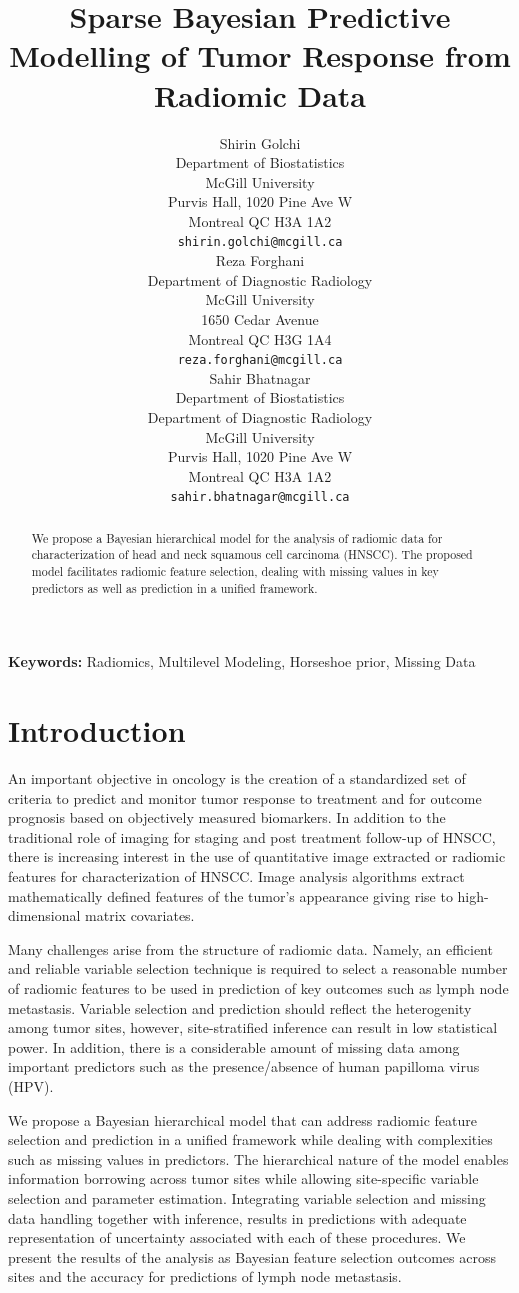\documentclass[10pt]{article}
\title{Sparse Bayesian Predictive Modelling of Tumor Response 
	from Radiomic Data}
\author{
  Shirin Golchi\\
  Department of Biostatistics\\ McGill University \\
  Purvis Hall, 1020 Pine Ave W\\
  Montreal QC H3A 1A2 \\ 
  {\tt shirin.golchi@mcgill.ca} \\\And
  Reza Forghani \\
  Department of Diagnostic Radiology \\ McGill University \\
  1650 Cedar Avenue \\
  Montreal QC H3G 1A4 \\
  {\tt reza.forghani@mcgill.ca} \\\And
  Sahir Bhatnagar \\
  Department of Biostatistics\\ Department of Diagnostic Radiology \\ McGill University \\
  Purvis Hall, 1020 Pine Ave W\\
  Montreal QC H3A 1A2 \\
  {\tt sahir.bhatnagar@mcgill.ca} 
}
\date{}
\begin{document}
\maketitle
\begin{abstract}
We propose a Bayesian hierarchical model for the analysis of radiomic data for characterization of head and neck squamous cell carcinoma (HNSCC). The proposed model facilitates radiomic feature selection, dealing with missing values in key predictors as well as prediction in a unified framework. 


\end{abstract}

{\bf Keywords:} Radiomics, Multilevel Modeling, Horseshoe prior, Missing Data

\section{Introduction}

An important objective in oncology is the creation of a standardized set of criteria to predict and monitor tumor response to treatment and for outcome prognosis based on objectively measured biomarkers. In addition to the traditional role of imaging for staging and post treatment follow-up of HNSCC, there is increasing interest in the use of quantitative image extracted or radiomic features for characterization of HNSCC. Image analysis algorithms extract mathematically defined features of the tumor's appearance giving rise to high-dimensional matrix covariates. 

Many challenges arise from the structure of radiomic data. Namely, an efficient and reliable variable selection technique is required to select a reasonable number of radiomic features to be used in prediction of key outcomes such as lymph node metastasis. Variable selection and prediction should reflect the heterogenity among tumor sites, however, site-stratified inference can result in low statistical power. In addition, there is a considerable amount of missing data among important predictors such as the presence/absence of human papilloma virus (HPV). 

We propose a Bayesian hierarchical model that can address radiomic feature selection and prediction in a unified framework while dealing with complexities such as missing values in predictors. The hierarchical nature of the model enables information borrowing across tumor sites while allowing site-specific variable selection and parameter estimation. Integrating variable selection and missing data handling together with inference, results in predictions with adequate representation of uncertainty associated with each of these procedures. We present the results of the analysis as Bayesian feature selection outcomes across sites and the accuracy for predictions of lymph node metastasis.
\end{document}
